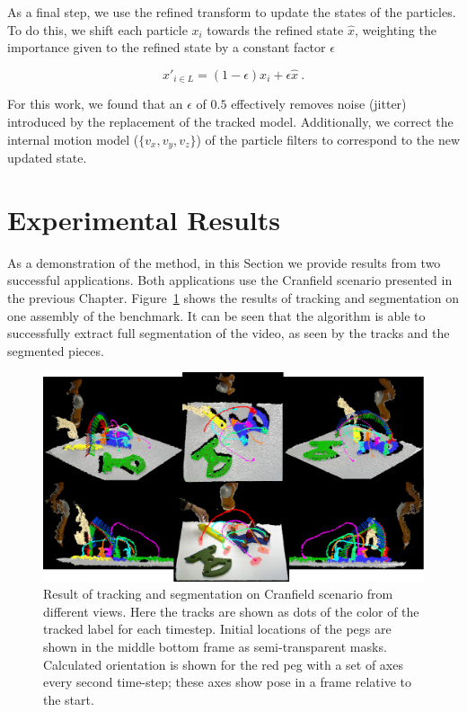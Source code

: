 As a final step, we use the refined transform to update the states of the particles. To do this, we shift each particle $x_i$ towards the refined state $\hat{x}$, weighting the importance given to the refined state by a constant factor $\epsilon$

\begin{equation}
\label{eqn:PFUpdate}
x'_{i \in L} = (1-\epsilon) x_i + \epsilon \hat{x}~.
\end{equation}

For this work, we found that an $\epsilon$ of $0.5$ effectively removes noise (jitter) introduced by the replacement of the tracked model. Additionally, we correct the internal motion model ($\{v_x, v_y, v_z\}$) of the particle filters to correspond to the new updated state.

\section{Experimental Results}
As a demonstration of the method, in this Section we provide results from two successful applications. Both applications use the Cranfield scenario \cite{collins1984development} presented in the previous Chapter. Figure~\ref{fig:Trajectories} shows the results of tracking and segmentation on one assembly of the benchmark. It can be seen that the algorithm is able to successfully extract full segmentation of the video, as seen by the tracks and the segmented pieces.

\begin{figure}[!ht]
  \centering
  \includegraphics[width=\linewidth]{figures/IROS2013/TrajectoriesNew.pdf}
  \caption[Cranfield Tracking Results]{Result of tracking and segmentation on Cranfield scenario from different views. Here the tracks are shown as dots of the color of the tracked label for each timestep. Initial locations of the pegs are shown in the middle bottom frame as semi-transparent masks. Calculated orientation is shown for the red peg with a set of axes every second time-step; these axes show pose in a frame relative to the start. }
  \label{fig:Trajectories}
\end{figure}

